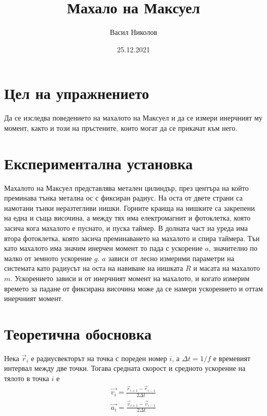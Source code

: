 \documentclass[aps, prb, twocolumn, a4paper, floatfix, reprint]{revtex4-2}
\begin{document}
\title{Махало на Максуел}
\author{Васил Николов}
\noaffiliation
\date{25.12.2021}
\maketitle

\section{Цел на упражнението}
Да се изследва поведението на махалото на Максуел и да се измери инерчният му момент, както и този на пръстените, които могат да се прикачат към него. 

\section{Експериментална установка}
Махалото на Максуел представлява метален цилиндър, през центъра на който преминава тънка метална ос с фиксиран радиус. На оста от двете страни са намотани тънки неразтегливи нишки. Горните краища на нишките са закрепени на една и съща височина, а между тях има електромагнит и фотоклетка, която засича кога махалото е пуснато, и пуска таймер. В долната част на уреда има втора фотоклетка, която засича преминаването на махалото и спира таймера. Тъи като махалото има значим инерчен момент то пада с ускорение $a$, значително по малко от земното ускорение $g$. $a$ зависи от лесно измерими параметри на системата като радиусът на оста на навиване на нишката $R$ и масата на махалото $m$. Ускорението зависи и от инерчният момент на махалото, и когато измерим времето за падане от фиксирана височина може да се намери ускорението и оттам инерчният момент. 

\section{Теоретична обосновка}
Нека $\vec{r}_i$ е радиусвекторът на точка с пореден номер $i$, а $\Delta t = 1/f$ е времевият интервал между две точки. Тогава средната скорост и средното ускорение на тялото в точка $i$ е 
\begin{subequations} \label{eq:1} 
\begin{gather} 
    \vec{v_i} = \frac{\vec{r}_{i + 1} - \vec{r}_{i - 1}}{2\Delta t} \\
    \vec{a_i} = \frac{\vec{v}_{i + 1} - \vec{v}_{i - 1}}{2\Delta t} 
\end{gather}
\end{subequations}
\end{document}
